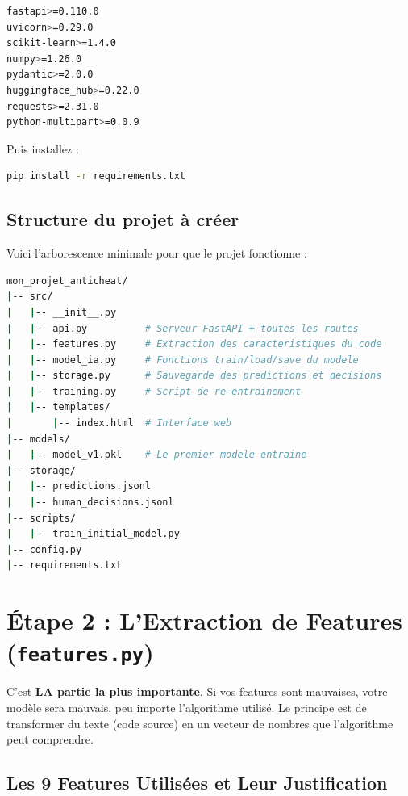 \documentclass[a4paper,11pt]{article}
\begin{document}
\begin{lstlisting}[language=bash, caption=requirements.txt]
fastapi>=0.110.0
uvicorn>=0.29.0
scikit-learn>=1.4.0
numpy>=1.26.0
pydantic>=2.0.0
huggingface_hub>=0.22.0
requests>=2.31.0
python-multipart>=0.0.9
\end{lstlisting}

Puis installez :
\begin{lstlisting}[language=bash]
pip install -r requirements.txt
\end{lstlisting}

\subsection{Structure du projet à créer}
Voici l'arborescence minimale pour que le projet fonctionne :

\begin{lstlisting}[language=bash, caption=Arborescence du projet]
mon_projet_anticheat/
|-- src/
|   |-- __init__.py
|   |-- api.py          # Serveur FastAPI + toutes les routes
|   |-- features.py     # Extraction des caracteristiques du code
|   |-- model_ia.py     # Fonctions train/load/save du modele
|   |-- storage.py      # Sauvegarde des predictions et decisions
|   |-- training.py     # Script de re-entrainement
|   |-- templates/
|       |-- index.html  # Interface web
|-- models/
|   |-- model_v1.pkl    # Le premier modele entraine
|-- storage/
|   |-- predictions.jsonl
|   |-- human_decisions.jsonl
|-- scripts/
|   |-- train_initial_model.py
|-- config.py
|-- requirements.txt
\end{lstlisting}


\section{Étape 2 : L'Extraction de Features (\texttt{features.py})}

C'est \textbf{LA partie la plus importante}. Si vos features sont mauvaises, votre modèle sera mauvais,
peu importe l'algorithme utilisé. Le principe est de transformer du texte (code source)
en un vecteur de nombres que l'algorithme peut comprendre.

\subsection{Les 9 Features Utilisées et Leur Justification}
\end{document}
